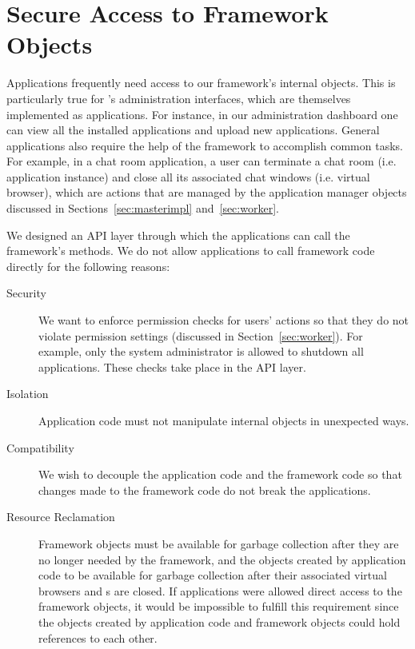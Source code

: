 \section{Secure Access to Framework Objects}
\label{sec:api}

Applications frequently need access to our framework's internal objects. 
This is particularly true for \cb's administration interfaces, which are 
themselves implemented as \cb applications.
For instance, in our administration dashboard one can view all the installed
applications and upload new applications. General applications also
require the help of the framework to accomplish common tasks.
For example, in
a chat room application, a user can terminate a chat room (i.e. application
instance) and close all its associated chat windows (i.e. virtual browser),
which are actions that are managed by the application manager objects discussed
in Sections~\ref{sec:masterimpl} and~\ref{sec:worker}.

We designed an API layer through which the applications can call the
framework's methods.  We do not allow applications to call framework
code directly for the following reasons:

\begin{description}

\item[Security]  We want to enforce permission checks for users' actions so that
they do not violate permission settings (discussed in
Section~\ref{sec:worker}). For example, only the system administrator is
allowed to shutdown all applications. 
These checks take place in the API layer.

\item[Isolation]  Application code must not 
manipulate internal objects in unexpected ways. 

\item[Compatibility]  
We wish to
decouple the application code and the framework code so  that changes made to
the framework code do not break the applications.   

\item[Resource Reclamation]  
Framework objects must be available for garbage collection after they are no
longer needed by the framework,  and the objects created by application code
to be available for garbage collection after their associated virtual browsers
and \appins{}s are closed.  If applications were allowed direct access to the
framework objects,   it would be impossible to fulfill this requirement
since the objects created by application code and framework objects could hold
references to each other.

\end{description}


